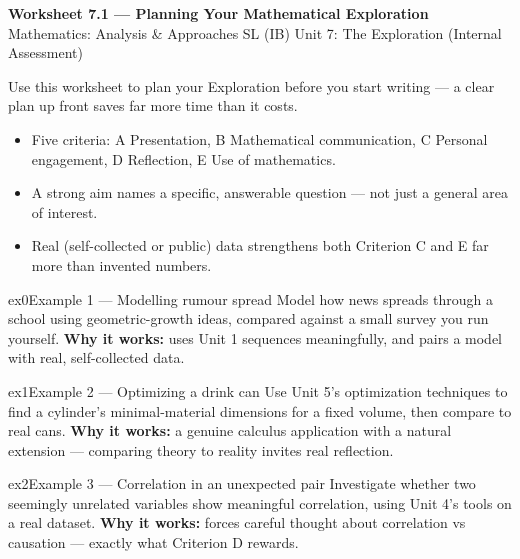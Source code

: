 \documentclass[11pt]{article}
\begin{document}
\begin{center}
{\LARGE\bfseries\color{titleblue}Worksheet 7.1 --- Planning Your Mathematical Exploration}\\[2pt]
{\small Mathematics: Analysis \& Approaches SL (IB) \textperiodcentered{} Unit 7: The Exploration (Internal Assessment)}
\end{center}

\begin{ideabox}
Use this worksheet to plan your Exploration before you start writing --- a clear plan up front saves far more time than it costs.
\begin{itemize}[leftmargin=*,itemsep=2pt]
  \item Five criteria: A Presentation, B Mathematical communication, C Personal engagement, D Reflection, E Use of mathematics.
  \item A strong aim names a specific, answerable question --- not just a general area of interest.
  \item Real (self-collected or public) data strengthens both Criterion C and E far more than invented numbers.
\end{itemize}
\end{ideabox}


\begin{example}{ex0}{Example 1 --- Modelling rumour spread}
Model how news spreads through a school using geometric-growth ideas, compared against a small survey you run yourself.\soln
\textbf{Why it works:} uses Unit 1 sequences meaningfully, and pairs a model with real, self-collected data.
\end{example}

\begin{example}{ex1}{Example 2 --- Optimizing a drink can}
Use Unit 5's optimization techniques to find a cylinder's minimal-material dimensions for a fixed volume, then compare to real cans.\soln
\textbf{Why it works:} a genuine calculus application with a natural extension --- comparing theory to reality invites real reflection.
\end{example}

\begin{example}{ex2}{Example 3 --- Correlation in an unexpected pair}
Investigate whether two seemingly unrelated variables show meaningful correlation, using Unit 4's tools on a real dataset.\soln
\textbf{Why it works:} forces careful thought about correlation vs causation --- exactly what Criterion D rewards.
\end{example}
\end{document}
